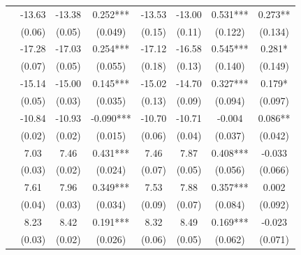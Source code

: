 \begin{ThreePartTable}
{\begin{longtable}[c]{p{3cm}S@{}S@{}S[round-precision=3]S@{}S@{}S[round-precision=3]S[round-precision=3]}
                &      -13.63&      -13.38&       0.252***&      -13.53&      -13.00&       0.531***&       0.273** \\
                                          &      (0.06)&      (0.05)&     (0.049)   &      (0.15)&      (0.11)&     (0.122)   &     (0.134)   \\
                   &      -17.28&      -17.03&       0.254***&      -17.12&      -16.58&       0.545***&       0.281*  \\
                                          &      (0.07)&      (0.05)&     (0.055)   &      (0.18)&      (0.13)&     (0.140)   &     (0.149)   \\
                          &      -15.14&      -15.00&       0.145***&      -15.02&      -14.70&       0.327***&       0.179*  \\
                                          &      (0.05)&      (0.03)&     (0.035)   &      (0.13)&      (0.09)&     (0.094)   &     (0.097)   \\
                    &      -10.84&      -10.93&      -0.090***&      -10.70&      -10.71&      -0.004   &       0.086** \\
                                          &      (0.02)&      (0.02)&     (0.015)   &      (0.06)&      (0.04)&     (0.037)   &     (0.042)   \\
            \midrule
               &        7.03&        7.46&       0.431***&        7.46&        7.87&       0.408***&      -0.033   \\
                                          &      (0.03)&      (0.02)&     (0.024)   &      (0.07)&      (0.05)&     (0.056)   &     (0.066)   \\
            &        7.61&        7.96&       0.349***&        7.53&        7.88&       0.357***&       0.002   \\
                                          &      (0.04)&      (0.03)&     (0.034)   &      (0.09)&      (0.07)&     (0.084)   &     (0.092)   \\
            &        8.23&        8.42&       0.191***&        8.32&        8.49&       0.169***&      -0.023   \\
                                          &      (0.03)&      (0.02)&     (0.026)   &      (0.06)&      (0.05)&     (0.062)   &     (0.071)   \\

\end{longtable}}
\end{ThreePartTable}
